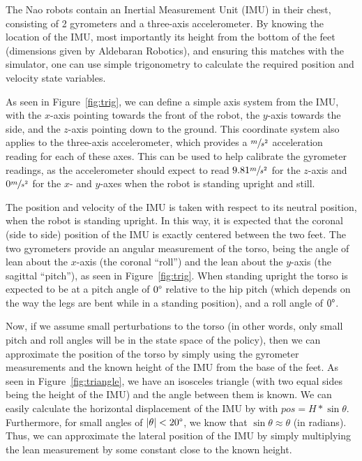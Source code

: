 The Nao robots contain an Inertial Measurement Unit (IMU) in their chest, consisting of 2 gyrometers and a three-axis accelerometer.\cite{nao_imu} By knowing the location of the IMU, most importantly its height from the bottom of the feet (dimensions given by Aldebaran Robotics), and ensuring this matches with the simulator, one can use simple trigonometry to calculate the required position and velocity state variables. 

As seen in Figure~\ref{fig:trig}, we can define a simple axis system from the IMU, with the $x$-axis pointing towards the front of the robot, the $y$-axis towards the side, and the $z$-axis pointing down to the ground. This coordinate system also applies to the three-axis accelerometer, which provides a $\sfrac{m}{s^2}$ acceleration reading for each of these axes. This can be used to help calibrate the gyrometer readings, as the accelerometer should expect to read $9.81\sfrac{m}{s^2}$ for the $z$-axis and $0\sfrac{m}{s^2}$ for the $x$- and $y$-axes when the robot is standing upright and still.


The position and velocity of the IMU is taken with respect to its neutral position, when the robot is standing upright. In this way, it is expected that the coronal (side to side) position of the IMU is exactly centered between the two feet. The two gyrometers provide an angular measurement of the torso, being the angle of lean about the $x$-axis (the coronal ``roll'') and the lean about the $y$-axis (the sagittal ``pitch''), as seen in Figure~\ref{fig:trig}. When standing upright the torso is expected to be at a pitch angle of $0\degree$ relative to the hip pitch (which depends on the way the legs are bent while in a standing position), and a roll angle of $0\degree$.

Now, if we assume small perturbations to the torso (in other words, only small pitch and roll angles will be in the state space of the policy), then we can approximate the position of the torso by simply using the gyrometer measurements and the known height of the IMU from the base of the feet. As seen in Figure~\ref{fig:triangle}, we have an isosceles triangle (with two equal sides being the height of the IMU) and the angle between them is known. We can easily calculate the horizontal displacement of the IMU by with $pos = H * \sin{\theta}$. Furthermore, for small angles of $|\theta| < 20\degree$, we know that $\sin{\theta} \approx \theta$ (in radians). Thus, we can approximate the lateral position of the IMU by simply multiplying the lean measurement by some constant close to the known height.

